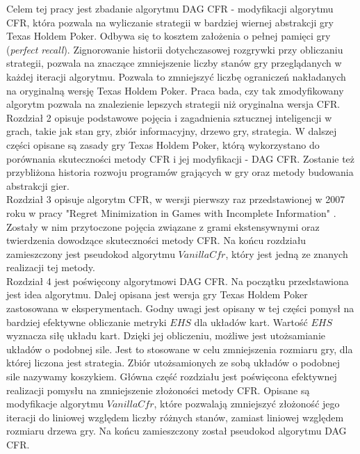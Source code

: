 \documentclass[licencjacka]{pracamgr}
\begin{document}
\noindent
Celem tej pracy jest zbadanie algorytmu DAG CFR - modyfikacji algorytmu CFR, która pozwala na wyliczanie strategii w bardziej wiernej
abstrakcji gry Texas Holdem Poker. Odbywa się to kosztem założenia o pełnej pamięci gry (\emph{perfect recall}).
Zignorowanie historii dotychczasowej rozgrywki przy obliczaniu strategii, pozwala na znaczące zmniejszenie liczby
stanów gry przeglądanych w każdej iteracji algorytmu. Pozwala to zmniejszyć liczbę ograniczeń nakładanych
na oryginalną wersję Texas Holdem Poker. Praca bada, czy tak zmodyfikowany algorytm pozwala na znalezienie
lepszych strategii niż oryginalna wersja CFR. \\

\noindent
Rozdział 2 opisuje podstawowe pojęcia i zagadnienia sztucznej inteligencji w grach, takie jak
stan gry, zbiór informacyjny, drzewo gry, strategia. W dalszej części opisane są zasady gry
Texas Holdem Poker, którą wykorzystano do porównania skuteczności metody CFR i jej modyfikacji - DAG CFR.
Zostanie też przybliżona historia rozwoju programów grających w gry oraz metody budowania abstrakcji gier. \\

\noindent
Rozdział 3 opisuje algorytm CFR, w wersji pierwszy raz przedstawionej w 2007 roku w pracy
"Regret Minimization in Games with Incomplete Information" \cite{cfr}. Zostały w nim przytoczone pojęcia
związane z grami ekstensywnymi oraz twierdzenia dowodzące skuteczności metody CFR. Na końcu rozdziału
zamieszczony jest pseudokod algorytmu $VanillaCfr$, który jest jedną ze znanych realizacji tej metody. \\

\noindent
Rozdział 4 jest poświęcony algorytmowi DAG CFR. Na początku przedstawiona jest idea algorytmu.
Dalej opisana jest wersja gry Texas Holdem Poker zastosowana w eksperymentach. Godny uwagi
jest opisany w tej części pomysł na bardziej efektywne obliczanie metryki $EHS$ dla układów kart.
Wartość $EHS$ wyznacza siłę układu kart. Dzięki jej obliczeniu, możliwe jest utożsamianie układów
o podobnej sile. Jest to stosowane w celu zmniejszenia rozmiaru gry, dla której liczona jest strategia.
Zbiór utożsamionych ze sobą układów o podobnej sile nazywamy koszykiem.
Główna część rozdziału jest poświęcona efektywnej realizacji pomysłu na zmniejszenie złożoności
metody CFR. Opisane są modyfikacje algorytmu $VanillaCfr$, które pozwalają zmniejszyć złożoność
jego iteracji do liniowej względem liczby różnych stanów, zamiast liniowej względem rozmiaru drzewa gry.
Na końcu zamieszczony został pseudokod algorytmu DAG CFR. \\
\end{document}
